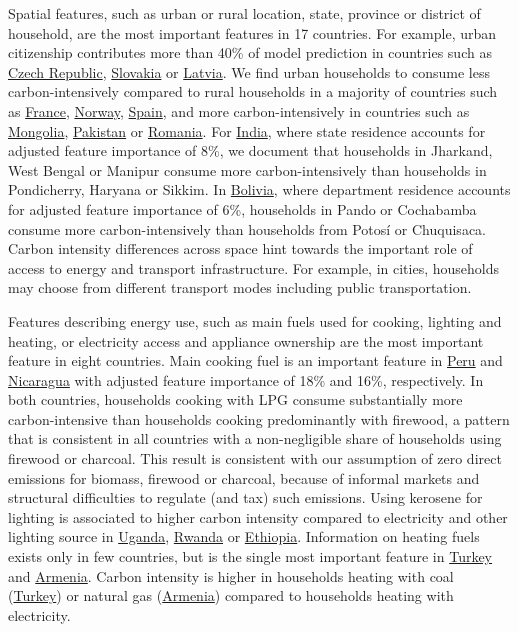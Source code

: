 \documentclass[12pt, a4paper]{article}
\begin{document}
Spatial features, such as urban or rural location, state, province or district of household, are the most important features in 17 countries. For example, urban citizenship contributes more than 40\% of model prediction in countries such as \hyperref[fig:5b_CZE]{Czech Republic}, \hyperref[fig:5b_SVK]{Slovakia} or \hyperref[fig:5b_LVA]{Latvia}. We find urban households to consume less carbon-intensively compared to rural households in a majority of countries such as \hyperref[fig:5b_FRA]{France}, \hyperref[fig:5b_NOR]{Norway}, \hyperref[fig:5b_ESP]{Spain}, and more carbon-intensively in countries such as \hyperref[fig:5b_MNG]{Mongolia}, \hyperref[fig:5b_PAK]{Pakistan} or \hyperref[fig:5b_ROU]{Romania}. For \hyperref[fig:5b_IND]{India}, where state residence accounts for adjusted feature importance of 8\%, we document that households in Jharkand, West Bengal or Manipur consume more carbon-intensively than households in Pondicherry, Haryana or Sikkim. In \hyperref[fig:5b_BOL]{Bolivia}, where department residence accounts for adjusted feature importance of 6\%, households in Pando or Cochabamba consume more carbon-intensively than households from Potosí or Chuquisaca. Carbon intensity differences across space hint towards the important role of access to energy and transport infrastructure. For example, in cities, households may choose from different transport modes including public transportation. 

Features describing energy use, such as main fuels used for cooking, lighting and heating, or electricity access and appliance ownership are the most important feature in eight countries. Main cooking fuel is an important feature in \hyperref[fig:5b_PER]{Peru} and \hyperref[fig:5b_NIC]{Nicaragua} with adjusted feature importance of 18\% and 16\%, respectively. In both countries, households cooking with LPG consume substantially more carbon-intensive than households cooking predominantly with firewood, a pattern that is consistent in all countries with a non-negligible share of households using firewood or charcoal. This result is consistent with our assumption of zero direct emissions for biomass, firewood or charcoal, because of informal markets and structural difficulties to regulate (and tax) such emissions. Using kerosene for lighting is associated to higher carbon intensity compared to electricity and other lighting source in \hyperref[fig:5b_UGA]{Uganda}, \hyperref[fig:5b_RWA]{Rwanda} or \hyperref[fig:5b_ETH]{Ethiopia}. Information on heating fuels exists only in few countries, but is the single most important feature in \hyperref[fig:5b_TUR]{Turkey} and \hyperref[fig:5b_ARM]{Armenia}. Carbon intensity is higher in households heating with coal (\hyperref[fig:5b_TUR]{Turkey}) or natural gas (\hyperref[fig:5b_ARM]{Armenia}) compared to households heating with electricity.
\end{document}
